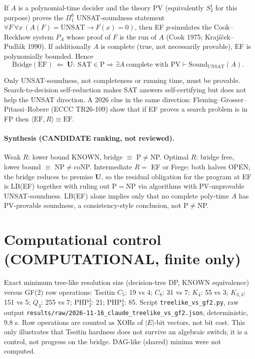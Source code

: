 \documentclass[11pt]{article}
\begin{document}
\begin{theorem}\label{t:ef}
If $A$ is a polynomial-time decider and the theory PV (equivalently $S^1_2$ for this
purpose) proves the $\Pi^b_1$ UNSAT-soundness statement
$\forall F\,\forall x\,(A(F)=\mathrm{UNSAT}\to F(x)=0)$, then EF $p$-simulates the
Cook--Reckhow system $P_A$ whose proof of $F$ is the run of $A$ (Cook 1975;
Kraj\'i\v{c}ek--Pudl\'ak 1990). If additionally $A$ is complete (true, not necessarily
provable), EF is polynomially bounded. Hence
\[\mathrm{Bridge}(\mathrm{EF})\ \Leftarrow\ \mathbf U:\ \mathrm{SAT}\in\mathrm P\Rightarrow\exists A\ \text{complete with PV}\vdash\mathrm{Sound}_{\mathrm{UNSAT}}(A).\]
\end{theorem}
Only UNSAT-soundness, not completeness or running time, must be provable. Search-to-decision
self-reduction makes SAT answers self-certifying but does not help the UNSAT direction.
A 2026 clue in the same direction: Fleming--Grosser--Pitassi--Robere (ECCC TR26-109) show
that if EF proves a search problem is in FP then $\langle\mathrm{EF},R\rangle\equiv\mathrm{EF}$.

\paragraph{Synthesis (CANDIDATE ranking, not reviewed).}
Weak $R$: lower bound KNOWN, bridge $\equiv$ P$\ne$NP. Optimal $R$: bridge free, lower bound
$\equiv$ NP$\ne$coNP. Intermediate $R=$ EF or Frege: both halves OPEN; the bridge reduces to
premise $\mathbf U$, so the residual obligation for the program at EF is
LB(EF) together with ruling out P$=$NP via algorithms with PV-unprovable UNSAT-soundness.
LB(EF) alone implies only that no complete poly-time $A$ has PV-provable soundness,
a consistency-style conclusion, not P$\ne$NP.

\section{Computational control (COMPUTATIONAL, finite only)}
Exact minimum tree-like resolution size (decision-tree DP, KNOWN equivalence) versus GF(2)
row operations: Tseitin $C_5$: 19 vs 4; $C_8$: 31 vs 7; $K_4$: 55 vs 3; $K_{3,3}$: 151 vs 5;
$Q_3$: 255 vs 7; PHP$^3_2$: 21; PHP$^4_3$: 85. Script
\texttt{treelike\_vs\_gf2.py}, raw output
\texttt{results/raw/2026-11-16\_claude\_treelike\_vs\_gf2.json}, deterministic, 9.8 s.
Row operations are counted as XORs of $|E|$-bit vectors, not bit cost. This only illustrates
that Tseitin hardness does not survive an algebraic switch; it is a control, not progress
on the bridge. DAG-like (shared) minima were not computed.
\end{document}
